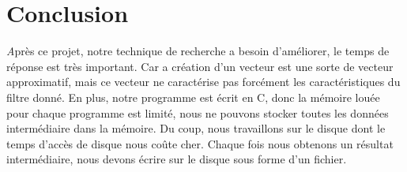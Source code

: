 \chapter{Conclusion}
	{\huge \itshape A}près ce projet, notre technique de recherche a besoin d'améliorer, le temps de réponse est très important. Car a création d'un vecteur est une sorte de vecteur approximatif, mais ce vecteur ne caractérise pas forcément les caractéristiques du filtre donné. En plus, notre programme est écrit en C, donc la mémoire louée pour chaque programme est limité, nous ne pouvons stocker toutes les données intermédiaire dans la mémoire. Du coup, nous travaillons sur le disque dont le temps d'accès de disque nous coûte cher. Chaque fois nous obtenons un résultat intermédiaire, nous devons écrire sur le disque sous forme d'un fichier.





